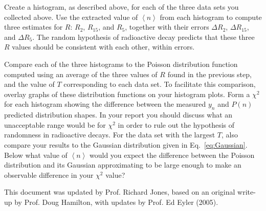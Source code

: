 \documentclass{revtex4}
\begin{document}
Create a histogram, as described above, for each of the three data sets
you collected above.  Use the extracted value of $\left<n\right>$ from each
histogram to compute three estimates for $R$: $R_2$, $R_{15}$, and $R_5$,
together with their errors $\Delta R_2$, $\Delta R_{15}$, and $\Delta R_5$.
The random hypothesis of radioactive decay predicts that these three $R$
values should be consistent with each other, within errors.

Compare each of the three histograms to the Poisson distribution function
computed using an average of the three values of $R$ found in the previous
step, and the value of $T$ corresponding to each data set.  To facilitate
this comparison, overlay graphs of these distribution functions on your 
histogram plots.  Form a $\chi^2$ for each histogram showing the difference
between the measured $y_n$ and $P(n)$ predicted distribution shapes.  In
your report you should discuss what an unacceptable range would be for
$\chi^2$ in order to rule out the hypothesis of randomness in radioactive
decays.  For the data set with the largest $T$, also compare your results
to the Gaussian distribution given in Eq.~\ref{eq:Gaussian}.  Below what
value of $\left<n\right>$ would you expect the difference between the Poisson 
distribution and its Gaussian approximating to be large enough to make
an observable difference in your $\chi^2$ value?


\begin{acknowledgments}
This document was updated by Prof. Richard Jones, based on an original
write-up by Prof. Doug Hamilton, with updates by Prof. Ed Eyler (2005).
\end{acknowledgments}

%

\end{document}
